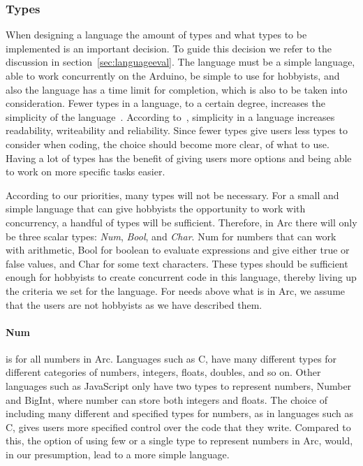 \subsubsection{Types}
When designing a language the amount of types and what types to be implemented is an important decision. To guide this decision we refer to the discussion in section~\ref{sec:languageeval}. The language must be a simple language, able to work concurrently on the Arduino, be simple to use for hobbyists, and also the language has a time limit for completion, which is also to be taken into consideration. Fewer types in a language, to a certain degree, increases the simplicity of the language~\cite{Sebesta2016}. According to~\cite{Sebesta2016}, simplicity in a language increases readability, writeability and reliability. Since fewer types give users less types to consider when coding, the choice should become more clear, of what to use. Having a lot of types has the benefit of giving users more options and being able to work on more specific tasks easier.

According to our priorities, many types will not be necessary. For a small and simple language that can give hobbyists the opportunity to work with concurrency, a handful of types will be sufficient. Therefore, in Arc there will only be three scalar types: \textit{Num}, \textit{Bool}, and \textit{Char}. Num for numbers that can work with arithmetic, Bool for boolean to evaluate expressions and give either true or false values, and Char for some text characters. These types should be sufficient enough for hobbyists to create concurrent code in this language, thereby living up the criteria we set for the language. For needs above what is in Arc, we assume that the users are not hobbyists as we have described them.

\paragraph{Num} is for all numbers in Arc. Languages such as C, have many different types for different categories of numbers, integers, floats, doubles, and so on. Other languages such as JavaScript only have two types to represent numbers, Number and BigInt, where number can store both integers and floats.
The choice of including many different and specified types for numbers, as in languages such as C, gives users more specified control over the code that they write.
Compared to this, the option of using few or a single type to represent numbers in Arc, would, in our presumption, lead to a more simple language.

